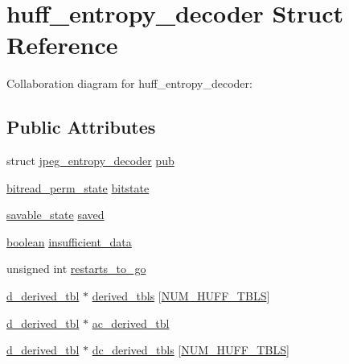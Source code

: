 \hypertarget{structhuff__entropy__decoder}{}\section{huff\+\_\+entropy\+\_\+decoder Struct Reference}
\label{structhuff__entropy__decoder}


Collaboration diagram for huff\+\_\+entropy\+\_\+decoder\+:
\subsection*{Public Attributes}
\begin{DoxyCompactItemize}
\item 
struct \mbox{\hyperlink{structjpeg__entropy__decoder}{jpeg\+\_\+entropy\+\_\+decoder}} \mbox{\hyperlink{structhuff__entropy__decoder_a85f304c89441e96be66e49685cf24c3d}{pub}}
\item 
\mbox{\hyperlink{structbitread__perm__state}{bitread\+\_\+perm\+\_\+state}} \mbox{\hyperlink{structhuff__entropy__decoder_a06e5f8944ccb6057c6f72b3df2441223}{bitstate}}
\item 
\mbox{\hyperlink{structsavable__state}{savable\+\_\+state}} \mbox{\hyperlink{structhuff__entropy__decoder_a0e0efb55a8a5b01e1e49aa9c3fb8dfe6}{saved}}
\item 
\mbox{\hyperlink{jmorecfg_8h_a7c6368b321bd9acd0149b030bb8275ed}{boolean}} \mbox{\hyperlink{structhuff__entropy__decoder_a412a9c88d74ed51774d25757b602b7ae}{insufficient\+\_\+data}}
\item 
unsigned int \mbox{\hyperlink{structhuff__entropy__decoder_af6005b639dada949c62767bed24daa1a}{restarts\+\_\+to\+\_\+go}}
\item 
\mbox{\hyperlink{structd__derived__tbl}{d\+\_\+derived\+\_\+tbl}} $\ast$ \mbox{\hyperlink{structhuff__entropy__decoder_a615d2735aebeee55b9820f09700677be}{derived\+\_\+tbls}} \mbox{[}\mbox{\hyperlink{jpeglib_8h_a6b12985705944e0623b671f29dc5722e}{N\+U\+M\+\_\+\+H\+U\+F\+F\+\_\+\+T\+B\+LS}}\mbox{]}
\item 
\mbox{\hyperlink{structd__derived__tbl}{d\+\_\+derived\+\_\+tbl}} $\ast$ \mbox{\hyperlink{structhuff__entropy__decoder_adbbf18c6aa3065d9bcf6bf33079733e0}{ac\+\_\+derived\+\_\+tbl}}
\item 
\mbox{\hyperlink{structd__derived__tbl}{d\+\_\+derived\+\_\+tbl}} $\ast$ \mbox{\hyperlink{structhuff__entropy__decoder_a277328a6f93b55616bd86b0056098c65}{dc\+\_\+derived\+\_\+tbls}} \mbox{[}\mbox{\hyperlink{jpeglib_8h_a6b12985705944e0623b671f29dc5722e}{N\+U\+M\+\_\+\+H\+U\+F\+F\+\_\+\+T\+B\+LS}}\mbox{]}

\end{DoxyCompactItemize}
